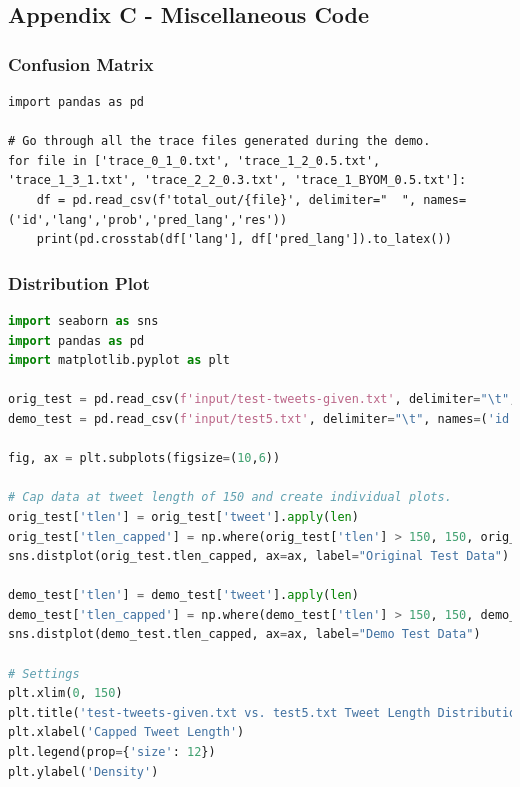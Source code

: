 \documentclass[runningheads]{llncs}
\begin{document}
\subsection{Appendix C - Miscellaneous Code}

\subsubsection{Confusion Matrix}

\begin{lstlisting}[breaklines]
import pandas as pd

# Go through all the trace files generated during the demo.
for file in ['trace_0_1_0.txt', 'trace_1_2_0.5.txt', 'trace_1_3_1.txt', 'trace_2_2_0.3.txt', 'trace_1_BYOM_0.5.txt']:
    df = pd.read_csv(f'total_out/{file}', delimiter="  ", names=('id','lang','prob','pred_lang','res'))
    print(pd.crosstab(df['lang'], df['pred_lang']).to_latex())
\end{lstlisting}

\subsubsection{Distribution Plot}


\begin{lstlisting}[breaklines, language=Python]
import seaborn as sns
import pandas as pd
import matplotlib.pyplot as plt

orig_test = pd.read_csv(f'input/test-tweets-given.txt', delimiter="\t", names=('id','user','lang','tweet'))
demo_test = pd.read_csv(f'input/test5.txt', delimiter="\t", names=('id','user','lang','tweet'))

fig, ax = plt.subplots(figsize=(10,6))

# Cap data at tweet length of 150 and create individual plots.
orig_test['tlen'] = orig_test['tweet'].apply(len)
orig_test['tlen_capped'] = np.where(orig_test['tlen'] > 150, 150, orig_test['tlen'])
sns.distplot(orig_test.tlen_capped, ax=ax, label="Original Test Data")

demo_test['tlen'] = demo_test['tweet'].apply(len)
demo_test['tlen_capped'] = np.where(demo_test['tlen'] > 150, 150, demo_test['tlen'])
sns.distplot(demo_test.tlen_capped, ax=ax, label="Demo Test Data")

# Settings
plt.xlim(0, 150)
plt.title('test-tweets-given.txt vs. test5.txt Tweet Length Distribution')
plt.xlabel('Capped Tweet Length')
plt.legend(prop={'size': 12})
plt.ylabel('Density')
\end{lstlisting}
\end{document}
